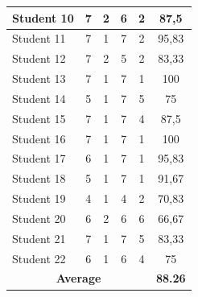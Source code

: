 \documentclass[conference,a4paper]{IEEEtran}
\begin{document}
\begin{table}[htbp]
{\begin{tabular}{|l|c|c|c|c|c|}
      Student 10                             & 7                                             & 2                                     & 6          & 2          & 87,5  \\ \hline
      Student 11                             & 7                                             & 1                                     & 7          & 2          & 95,83 \\ \hline
      Student 12                             & 7                                             & 2                                     & 5          & 2          & 83,33 \\ \hline
      Student 13                             & 7                                             & 1                                     & 7          & 1          & 100   \\ \hline
      Student 14                             & 5                                             & 1                                     & 7          & 5          & 75    \\ \hline
      Student 15                             & 7                                             & 1                                     & 7          & 4          & 87,5  \\ \hline
      Student 16                             & 7                                             & 1                                     & 7          & 1          & 100   \\ \hline
      Student 17                             & 6                                             & 1                                     & 7          & 1          & 95,83 \\ \hline
      Student 18                             & 5                                             & 1                                     & 7          & 1          & 91,67 \\ \hline
      Student 19                             & 4                                             & 1                                     & 4          & 2          & 70,83 \\ \hline
      Student 20                             & 6                                             & 2                                     & 6          & 6          & 66,67 \\ \hline
      Student 21                             & 7                                             & 1                                     & 7          & 5          & 83,33 \\ \hline
      Student 22                             & 6                                             & 1                                     & 6          & 4          & 75    \\ \hline
      \multicolumn{5}{|c|}{\textbf{Average}} & \textbf{88.26}                                                                                                          \\ \hline
    \end{tabular}%
  }
\end{table}
\end{document}
